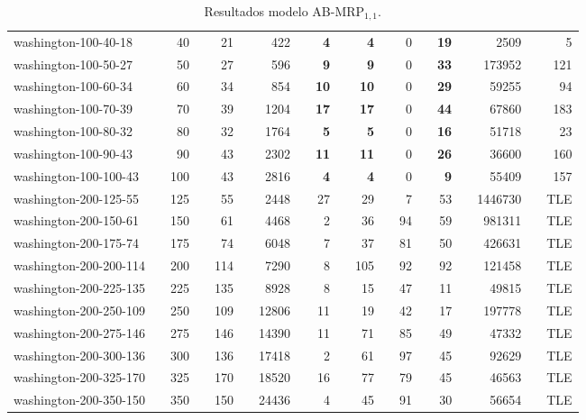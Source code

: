 \begin{table}[!ht]
{\begin{tabular}{llrlrlrlrlrlrlrlrlr}
washington-100-40-18 &  & 40 &  & 21 &  & 422 &  & \textbf{4} &  & \textbf{4} &  & 0 &  & \textbf{19} &  & 2509 &  & 5 \\
\rowcolor[HTML]{9B9B9B} 
washington-100-50-27 &  & 50 &  & 27 &  & 596 &  & \textbf{9} &  & \textbf{9} &  & 0 &  & \textbf{33} &  & 173952 &  & 121 \\
\rowcolor[HTML]{9B9B9B} 
washington-100-60-34 &  & 60 &  & 34 &  & 854 &  & \textbf{10} &  & \textbf{10} &  & 0 &  & \textbf{29} &  & 59255 &  & 94 \\
\rowcolor[HTML]{9B9B9B} 
washington-100-70-39 &  & 70 &  & 39 &  & 1204 &  & \textbf{17} &  & \textbf{17} &  & 0 &  & \textbf{44} &  & 67860 &  & 183 \\
\rowcolor[HTML]{9B9B9B} 
washington-100-80-32 &  & 80 &  & 32 &  & 1764 &  & \textbf{5} &  & \textbf{5} &  & 0 &  & \textbf{16} &  & 51718 &  & 23 \\
\rowcolor[HTML]{9B9B9B} 
washington-100-90-43 &  & 90 &  & 43 &  & 2302 &  & \textbf{11} &  & \textbf{11} &  & 0 &  & \textbf{26} &  & 36600 &  & 160 \\
\rowcolor[HTML]{9B9B9B} 
washington-100-100-43 &  & 100 &  & 43 &  & 2816 &  & \textbf{4} &  & \textbf{4} &  & 0 &  & \textbf{9} &  & 55409 &  & 157 \\ \hline
\rowcolor[HTML]{C0C0C0} 
washington-200-125-55 &  & 125 &  & 55 &  & 2448 &  & 27 &  & 29 &  & 7 &  & 53 &  & 1446730 &  & TLE \\
\rowcolor[HTML]{C0C0C0} 
washington-200-150-61 &  & 150 &  & 61 &  & 4468 &  & 2 &  & 36 &  & 94 &  & 59 &  & 981311 &  & TLE \\
\rowcolor[HTML]{C0C0C0} 
washington-200-175-74 &  & 175 &  & 74 &  & 6048 &  & 7 &  & 37 &  & 81 &  & 50 &  & 426631 &  & TLE \\
\rowcolor[HTML]{C0C0C0} 
washington-200-200-114 &  & 200 &  & 114 &  & 7290 &  & 8 &  & 105 &  & 92 &  & 92 &  & 121458 &  & TLE \\
\rowcolor[HTML]{C0C0C0} 
washington-200-225-135 &  & 225 &  & 135 &  & 8928 &  & 8 &  & 15 &  & 47 &  & 11 &  & 49815 &  & TLE \\
\rowcolor[HTML]{C0C0C0} 
washington-200-250-109 &  & 250 &  & 109 &  & 12806 &  & 11 &  & 19 &  & 42 &  & 17 &  & 197778 &  & TLE \\
\rowcolor[HTML]{C0C0C0} 
washington-200-275-146 &  & 275 &  & 146 &  & 14390 &  & 11 &  & 71 &  & 85 &  & 49 &  & 47332 &  & TLE \\
\rowcolor[HTML]{C0C0C0} 
washington-200-300-136 &  & 300 &  & 136 &  & 17418 &  & 2 &  & 61 &  & 97 &  & 45 &  & 92629 &  & TLE \\
\rowcolor[HTML]{C0C0C0} 
washington-200-325-170 &  & 325 &  & 170 &  & 18520 &  & 16 &  & 77 &  & 79 &  & 45 &  & 46563 &  & TLE \\
\rowcolor[HTML]{C0C0C0} 
washington-200-350-150 &  & 350 &  & 150 &  & 24436 &  & 4 &  & 45 &  & 91 &  & 30 &  & 56654 &  & TLE \\ \hline
\end{tabular}%
}
\caption{Resultados modelo AB-MRP$_{1, 1}$.}
\label{tab:ab-um}
\end{table}

